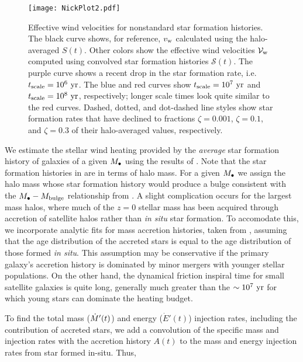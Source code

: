  \begin{figure}
  \texttt{[image: NickPlot2.pdf]}
  \caption{\label{fig:NickPlot2} Effective wind velocities for nonstandard
    star formation histories.  The black curve shows, for reference,
    $v_{\rm w}$ calculated using the halo-averaged $S(t)$.  Other
    colors show the effective wind velocities $\mathcal{V}_{\rm w}$
    computed using convolved star formation histories
    $\mathcal{S}(t)$.  The purple curve shows a recent drop in the
    star formation rate, i.e. $t_{\rm scale}=10^6~{\rm yr}$.  The blue
    and red curves show $t_{\rm scale}=10^7~{\rm yr}$ and $t_{\rm
      scale}=10^8~{\rm yr}$, respectively; longer scale times look
    quite similar to the red curves.  Dashed, dotted, and dot-dashed
    line styles show star formation rates that have declined to
    fractions $\zeta = 0.001$, $\zeta = 0.1$, and $\zeta = 0.3$ of
    their halo-averaged values, respectively. }
  \end{figure}
  We estimate the stellar wind heating provided by the {\it average}
  star formation history of galaxies of a given $M_{\bullet}$ using the
  results of \citet[eqs.~17-20]{MosterNaab+:2013a}.  Note that the
  star formation histories in \citet{MosterNaab+:2013a} are in terms
  of halo mass. For a given $M_{\bullet}$ we assign the halo mass whose star
  formation history would produce a bulge consistent with the
  $M_{\bullet}-M_{\rm bulge}$ relationship from \citet{McConnellMa:2013a}.  A
  slight complication occurs for the largest mass halos, where much of
  the $z=0$ stellar mass has been acquired through accretion of
  satellite halos rather than {\it in situ} star formation.  To
  accomodate this, we incorporate analytic fits for mass accretion
  histories, taken from \citet[their eqs.~21-23]{MosterNaab+:2013a},
  assuming that the age distribution of the accreted stars is equal to
  the age distribution of those formed {\it in situ}.  This assumption
  may be conservative if the primary galaxy's accretion history is
  dominated by minor mergers with younger stellar populations.  On the
  other hand, the dynamical friction inspiral time for small satellite
  galaxies is quite long, generally much greater than the $\sim
  10^7~{\rm yr}$ for which young stars can dominate the heating
  budget.  

To find the total mass ($\dot{M}'(t)$) and energy
  ($\dot{E}'(t)$) injection rates, including the contribution of
  accreted stars, we add a convolution of the specific mass and
  injection rates with the accretion history $A(t)$ to the mass and
  energy injection rates from star formed in-situ.  Thus,

